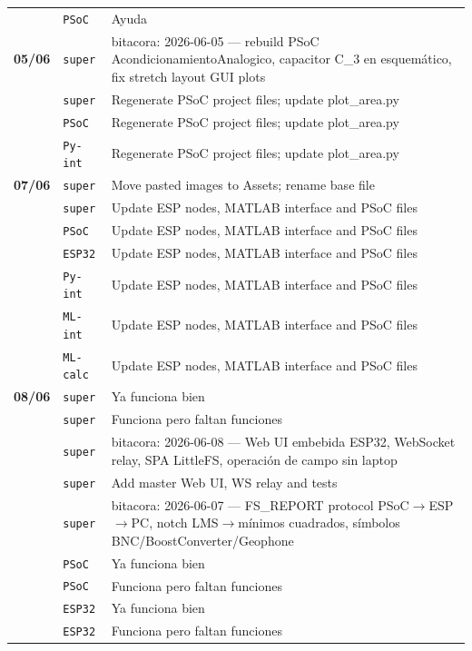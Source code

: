 \begin{longtable}{@{}p{1.7cm} p{1.5cm} p{12.2cm}@{}}
 & \texttt{\scriptsize PSoC} & Ayuda \\
\textbf{05/06} & \texttt{\scriptsize super} & bitacora: 2026-06-05 --- rebuild PSoC AcondicionamientoAnalogico, capacitor C\_3 en esquemático, fix stretch layout GUI plots \\
 & \texttt{\scriptsize super} & Regenerate PSoC project files; update plot\_area.py \\
 & \texttt{\scriptsize PSoC} & Regenerate PSoC project files; update plot\_area.py \\
 & \texttt{\scriptsize Py-int} & Regenerate PSoC project files; update plot\_area.py \\
\textbf{07/06} & \texttt{\scriptsize super} & Move pasted images to Assets; rename base file \\
 & \texttt{\scriptsize super} & Update ESP nodes, MATLAB interface and PSoC files \\
 & \texttt{\scriptsize PSoC} & Update ESP nodes, MATLAB interface and PSoC files \\
 & \texttt{\scriptsize ESP32} & Update ESP nodes, MATLAB interface and PSoC files \\
 & \texttt{\scriptsize Py-int} & Update ESP nodes, MATLAB interface and PSoC files \\
 & \texttt{\scriptsize ML-int} & Update ESP nodes, MATLAB interface and PSoC files \\
 & \texttt{\scriptsize ML-calc} & Update ESP nodes, MATLAB interface and PSoC files \\
\textbf{08/06} & \texttt{\scriptsize super} & Ya funciona bien \\
 & \texttt{\scriptsize super} & Funciona pero faltan funciones \\
 & \texttt{\scriptsize super} & bitacora: 2026-06-08 --- Web UI embebida ESP32, WebSocket relay, SPA LittleFS, operación de campo sin laptop \\
 & \texttt{\scriptsize super} & Add master Web UI, WS relay and tests \\
 & \texttt{\scriptsize super} & bitacora: 2026-06-07 --- FS\_REPORT protocol PSoC$\rightarrow$ESP$\rightarrow$PC, notch LMS$\rightarrow$mínimos cuadrados, símbolos BNC/BoostConverter/Geophone \\
 & \texttt{\scriptsize PSoC} & Ya funciona bien \\
 & \texttt{\scriptsize PSoC} & Funciona pero faltan funciones \\
 & \texttt{\scriptsize ESP32} & Ya funciona bien \\
 & \texttt{\scriptsize ESP32} & Funciona pero faltan funciones \\

\end{longtable}

